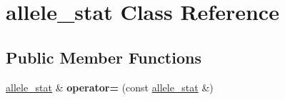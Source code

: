 \hypertarget{classallele__stat}{\section{allele\-\_\-stat Class Reference}
\label{classallele__stat}
}
\subsection*{Public Member Functions}
\begin{DoxyCompactItemize}
\item 
\hypertarget{classallele__stat_ae49a06d8ecc53bd6955f76ea1afc5a69}{\hyperlink{classallele__stat}{allele\-\_\-stat} \& {\bfseries operator=} (const \hyperlink{classallele__stat}{allele\-\_\-stat} \&)}\label{classallele__stat_ae49a06d8ecc53bd6955f76ea1afc5a69}

\end{DoxyCompactItemize}
